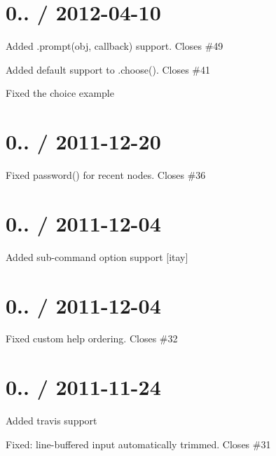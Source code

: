 \section*{0.. / 2012-\/04-\/10 }


\begin{DoxyItemize}
\item Added {\ttfamily .prompt(obj, callback)} support. Closes \#49
\item Added default support to .choose(). Closes \#41
\item Fixed the choice example
\end{DoxyItemize}

\section*{0.. / 2011-\/12-\/20 }


\begin{DoxyItemize}
\item Fixed {\ttfamily password()} for recent nodes. Closes \#36
\end{DoxyItemize}

\section*{0.. / 2011-\/12-\/04 }


\begin{DoxyItemize}
\item Added sub-\/command option support \mbox{[}itay\mbox{]}
\end{DoxyItemize}

\section*{0.. / 2011-\/12-\/04 }


\begin{DoxyItemize}
\item Fixed custom help ordering. Closes \#32
\end{DoxyItemize}

\section*{0.. / 2011-\/11-\/24 }


\begin{DoxyItemize}
\item Added travis support
\item Fixed\+: line-\/buffered input automatically trimmed. Closes \#31
\end{DoxyItemize}

